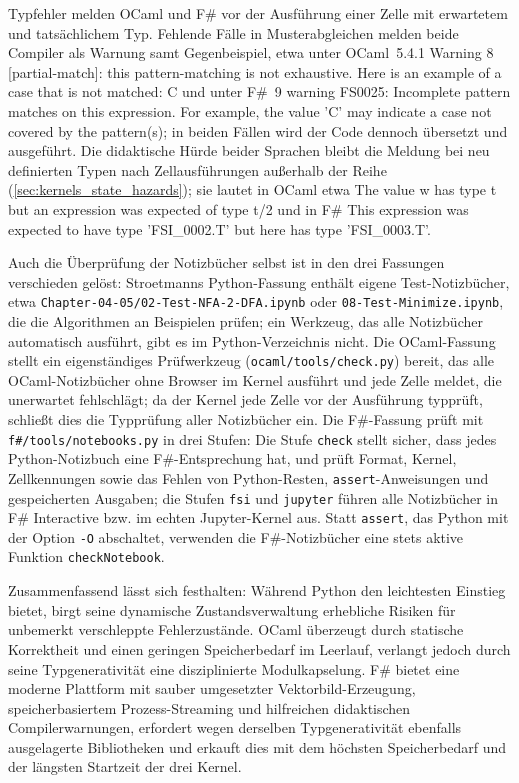 Typfehler melden OCaml und F\# vor der Ausführung einer Zelle mit erwartetem und tatsächlichem Typ.
Fehlende Fälle in Musterabgleichen melden beide Compiler als Warnung samt Gegenbeispiel, etwa unter OCaml~5.4.1 \glqq Warning 8 [partial-match]: this pattern-matching is not exhaustive.
Here is an example of a case that is not matched: C\grqq{} und unter F\#~9 \glqq warning FS0025: Incomplete pattern matches on this expression.
For example, the value 'C' may indicate a case not covered by the pattern(s)\grqq; in beiden Fällen wird der Code dennoch übersetzt und ausgeführt.
Die didaktische Hürde beider Sprachen bleibt die Meldung bei neu definierten Typen nach Zellausführungen außerhalb der Reihe (\cref{sec:kernels_state_hazards}); sie lautet in OCaml etwa \glqq The value w has type t but an expression was expected of type t/2\grqq{} und in F\# \glqq This expression was expected to have type 'FSI\_0002.T' but here has type 'FSI\_0003.T'\grqq.

Auch die Überprüfung der Notizbücher selbst ist in den drei Fassungen verschieden gelöst:
Stroetmanns Python-Fassung enthält eigene Test-Notizbücher, etwa \texttt{Chapter-04-05/02-Test-NFA-2-DFA.ipynb} oder \texttt{08-Test-Minimize.ipynb}, die die Algorithmen an Beispielen prüfen; ein Werkzeug, das alle Notizbücher automatisch ausführt, gibt es im Python-Verzeichnis nicht.
Die OCaml-Fassung stellt ein eigenständiges Prüfwerkzeug (\texttt{ocaml/tools/check.py}) bereit, das alle OCaml-Notizbücher ohne Browser im Kernel ausführt und jede Zelle meldet, die unerwartet fehlschlägt; da der Kernel jede Zelle vor der Ausführung typprüft, schließt dies die Typprüfung aller Notizbücher ein.
Die F\#-Fassung prüft mit \texttt{f\#/tools/notebooks.py} in drei Stufen: Die Stufe \texttt{check} stellt sicher, dass jedes Python-Notizbuch eine F\#-Entsprechung hat, und prüft Format, Kernel, Zellkennungen sowie das Fehlen von Python-Resten, \texttt{assert}-Anweisungen und gespeicherten Ausgaben; die Stufen \texttt{fsi} und \texttt{jupyter} führen alle Notizbücher in F\# Interactive bzw. im echten Jupyter-Kernel aus.
Statt \texttt{assert}, das Python mit der Option \texttt{-O} abschaltet, verwenden die F\#-Notizbücher eine stets aktive Funktion \texttt{checkNotebook}.

Zusammenfassend lässt sich festhalten: Während Python den leichtesten Einstieg bietet, birgt seine dynamische Zustandsverwaltung erhebliche Risiken für unbemerkt verschleppte Fehlerzustände.
OCaml überzeugt durch statische Korrektheit und einen geringen Speicherbedarf im Leerlauf, verlangt jedoch durch seine Typgenerativität eine disziplinierte Modulkapselung.
F\# bietet eine moderne Plattform mit sauber umgesetzter Vektorbild-Erzeugung, speicherbasiertem Prozess-Streaming und hilfreichen didaktischen Compilerwarnungen, erfordert wegen derselben Typgenerativität ebenfalls ausgelagerte Bibliotheken und erkauft dies mit dem höchsten Speicherbedarf und der längsten Startzeit der drei Kernel.
